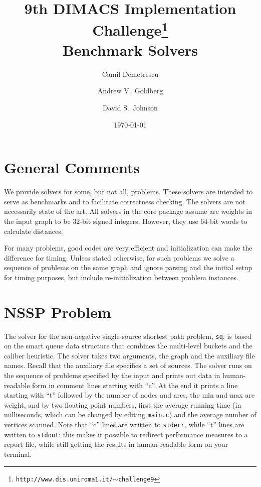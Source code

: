 \documentclass[11pt]{article}
\begin{document}
\title{9th DIMACS Implementation Challenge\footnote{\tt http://www.dis.uniroma1.it/$\sim$challenge9}\\ Benchmark Solvers}

\author{
Camil Demetrescu
\and
Andrew V.\ Goldberg
\and
David S.\ Johnson
}

\date{\today}

\maketitle

\section{General Comments}
We provide solvers for some, but not all, problems. These solvers
are intended to serve as benchmarks and to facilitate correctness
checking. The solvers are not necessarily state of the art. All
solvers in the core package assume arc weights in the input graph
to be 32-bit signed integers. However, they use 64-bit words to
calculate distances.

For many problems, good codes are very efficient and initialization
can make the difference for timing.
Unless stated otherwise, for such problems we solve a sequence of
problems on the same graph and ignore parsing and the initial setup for timing
purposes, but include re-initialization between problem instances.


\section{NSSP Problem}

The solver for the non-negative single-source shortest path problem,
{\tt sq}, is based on the smart queue data structure that
combines the multi-level buckets and the caliber heuristic.
The solver takes two arguments, the graph and the auxiliary file names.
Recall that the auxiliary file specifies a set of sources.
The solver runs on the sequence of problems specified by the input and
prints out data in human-readable form in comment lines starting with ``c''.
At the end it prints a line starting with ``t'' followed by the number of nodes and arcs, the min and max arc weight, and
by two
floating point numbers, first the average running time (in milliseconds,
which can be changed by editing {\tt main.c}) and the average
number of vertices scanned. Note that ``c'' lines are written to {\tt stderr}, while ``t'' lines are written to {\tt stdout}: this makes it possible to redirect performance measures to a report file, while still getting the results in human-readable form on your terminal.
\end{document}
